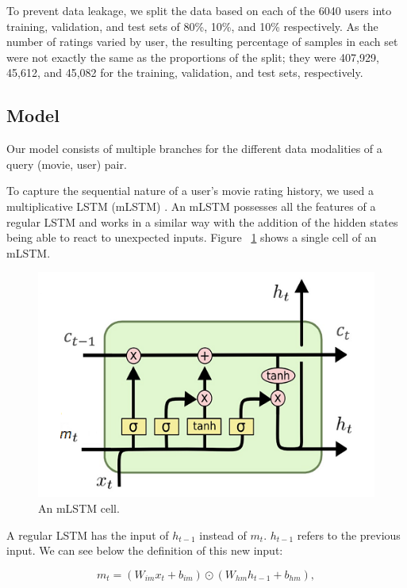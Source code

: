\documentclass{bioinfo}
\begin{document}
\begin{methods}
To prevent data leakage, we split the data based on each of the 6040 users into training, validation, and test sets of 80\%, 10\%, and 10\% respectively. As the number of ratings varied by user, the resulting percentage of samples in each set were not exactly the same as the proportions of the split; they were 407,929, 45,612, and 45,082 for the training, validation, and test sets, respectively.

\subsection{Model}

Our model consists of multiple branches for the different data modalities of a query (movie, user) pair.

To capture the sequential nature of a user's movie rating history, we used a multiplicative LSTM (mLSTM) \citep{krause2016multiplicative}. An mLSTM possesses all the features of a regular LSTM and works in a similar way with the addition of the hidden states being able to react to unexpected inputs. Figure ~\ref{fig:mlstm} shows a single cell of an mLSTM.

\begin{figure}[h]
    \centering
    \includegraphics[width=\columnwidth]{figures/mlstm.png}
    \caption{An mLSTM cell.}
    \label{fig:mlstm}
\end{figure}

A regular LSTM has the input of {${h_{t-1}}$} instead of {$m_{t}$}. {${h_{t-1}}$} refers to the previous input. We can see below the definition of this new input:

\begin{equation} \label{mlstm_equation}
m_t = (W_{im}x_t + b_{im}) \odot (W_{hm}h_{t-1} + b_{hm}),
\end{equation}


\end{methods}
\end{document}
